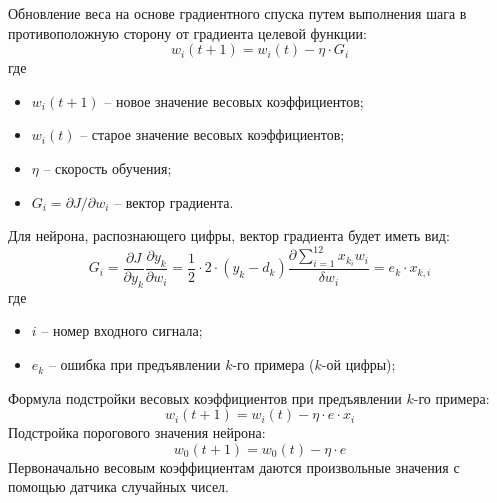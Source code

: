 \documentclass{beamer}
\begin{document}
\begin{frame}[t]
	Обновление веса на основе градиентного спуска путем выполнения шага в противоположную сторону от градиента целевой функции:
	\[w_i(t+1)=w_i(t)-\eta\cdot G_i\]
	где
	\begin{itemize}
		\item $w_i(t+1)$ -- новое значение весовых коэффициентов; 
		\item $w_i(t)$ -- старое значение весовых коэффициентов;		
		\item $\eta$ -- скорость обучения;				
		\item $G_i = \partial J/\partial w_i$ -- вектор градиента.						
	\end{itemize}	
\end{frame}

\begin{frame}[t]
	Для нейрона, распознающего цифры, вектор градиента будет иметь вид: 
	\[G_i = \frac{\partial J}{\partial y_k} \frac{\partial y_k}{\partial w_i} 
	      = \frac{1}{2}\cdot 2\cdot (y_k-d_k)\frac{\partial \sum_{i=1}^{12}x_{k_i}w_i}{\delta w_i}
		  = e_k\cdot x_{k,i}	 
	\]
	где
	\begin{itemize}
		\item $i$ -- номер входного сигнала; 
		\item $e_k$ -- ошибка при предъявлении $k$-го примера ($k$-ой цифры);		
	\end{itemize}
	Формула подстройки весовых коэффициентов при предъявлении $k$-го примера:
	\[w_i(t+1)=w_i(t)-\eta\cdot e\cdot x_i\]	
	Подстройка порогового значения нейрона:
	\[w_0(t+1)=w_0(t)-\eta\cdot e\]
	Первоначально весовым коэффициентам даются произвольные значения с помощью датчика случайных чисел.
\end{frame}
\end{document}
